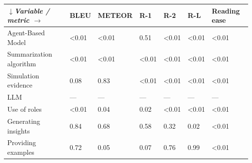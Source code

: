 \begin{tabular}{|l|l|l|l|l|l|l|}
\hline
\textit{$\downarrow$Variable / metric $\rightarrow$} & BLEU & METEOR & R-1 & R-2 & R-L & Reading ease \\
 \hline
 Agent-Based Model & \textless{}0.01 & \textless{}0.01 & 0.51 & \textless{}0.01 & \textless{}0.01 & \textless{}0.01 \\
 \hline
 Summarization algorithm & \textless{}0.01 & \textless{}0.01 & \textless{}0.01 & \textless{}0.01 & \textless{}0.01 & \textless{}0.01 \\
 \hline
 Simulation evidence & 0.08 & 0.83 & \textless{}0.01 & \textless{}0.01 & \textless{}0.01 & \textless{}0.01 \\
 \hline
 LLM & — & — & — & — & — & — \\
 \hline
 Use of roles & \textless{}0.01 & 0.04 & 0.02 & \textless{}0.01 & \textless{}0.01 & \textless{}0.01 \\
 \hline
 Generating insights & 0.84 & 0.68 & 0.58 & 0.32 & 0.02 & \textless{}0.01 \\
 \hline
 Providing examples & 0.72 & 0.05 & 0.07 & 0.76 & 0.99 & \textless{}0.01 \\
\hline
\end{tabular}
